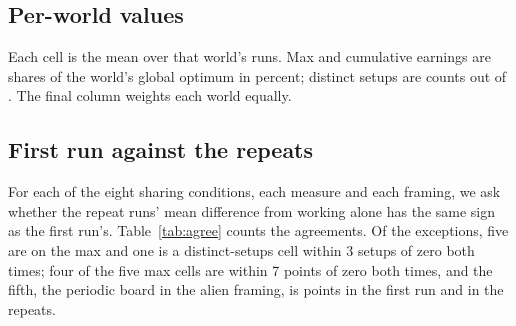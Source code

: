 \subsection{Per-world values}\label{app:perworld}

Each cell is the mean over that world's runs. Max and cumulative earnings are shares of the world's global
optimum in percent; distinct setups are counts out of \NAttempts{}. The final column weights each world
equally.

\begin{table}[H]
  \centering \small \setlength{\tabcolsep}{4pt}
  \caption{Lemonade framing: maximum single-round profit.}
  
\end{table}
\begin{table}[H]
  \centering \small \setlength{\tabcolsep}{4pt}
  \caption{Alien framing: maximum single-round profit.}
  
\end{table}
\begin{table}[H]
  \centering \small \setlength{\tabcolsep}{4pt}
  \caption{Lemonade framing: cumulative earnings over 20 rounds.}
  
\end{table}
\begin{table}[H]
  \centering \small \setlength{\tabcolsep}{4pt}
  \caption{Alien framing: cumulative earnings over 20 rounds.}
  
\end{table}
\begin{table}[H]
  \centering \small \setlength{\tabcolsep}{4pt}
  \caption{Lemonade framing: distinct setups tried.}
  
\end{table}
\begin{table}[H]
  \centering \small \setlength{\tabcolsep}{4pt}
  \caption{Alien framing: distinct setups tried.}
  
\end{table}

\subsection{First run against the repeats}\label{app:agree}

For each of the eight sharing conditions, each measure and each framing, we ask whether the repeat runs' mean
difference from working alone has the same sign as the first run's. Table~\ref{tab:agree} counts the
agreements. Of the \AgreeExceptions{} exceptions, five are on the max and one is a distinct-setups cell within 3
setups of zero both times; four of the five max cells are within 7 points of zero both times, and the fifth, the
periodic board in the alien framing, is \AgreeAliPeriodicFirst{} points in the first run and
\AgreeAliPeriodicRepeat{} in the repeats.

